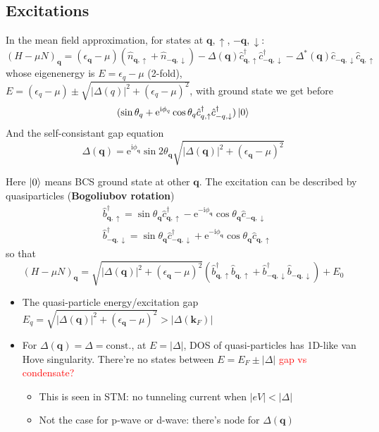 \documentclass[11pt,letterpaper]{article}
\numberwithin{equation}{section} %
\renewcommand*{\vec}[1]{\bm{#1}}
\newcommand\mi{\mathrm{i}}
\newcommand\e{\mathrm{e}}
\newcommand{\spind}{\ensuremath{\downarrow}}
\newcommand{\spinu}{\ensuremath{\uparrow}}
\begin{document}
\subsection{Excitations}
\label{sub:excitations}
In the mean field approximation, for states at $\vec q, \spinu$, $-\vec q,
\spind$: 
\begin{equation}
	(H-\mu N)_{\vec q} = (\epsilon_{\vec q} - \mu)(\hat n_{\vec q,\spinu} + 
	\hat n_{-\vec q, \spind}) - \Delta(\vec q)\hat c_{\vec q,\spinu}^\dagger
	\hat c_{-\vec q,\spind}^\dagger - \Delta^*(\vec q) \hat c_{-\vec q,\spind}
	\hat c_{\vec q, \spinu}
\end{equation}
whose eigenenergy is $E = \epsilon_q - \mu$ (2-fold), $E = (\epsilon_q-\mu)
\pm \sqrt{|\Delta(q)|^2+(\epsilon_q-\mu)^2}$, with ground state we get before
\begin{equation}
	(\sin\theta_q + \e^{\mi\phi_q}\cos\theta_q \hat c_{q,\spinu}^\dagger
	\hat c_{-q,\spind}^\dagger)\ket{0}
\end{equation}
And the self-consistant gap equation
\begin{equation}\label{eq:pari_gap_in_exci}
	\Delta(\vec q) = \e^{\mi\phi_{\vec q}}\sin 2\theta_{\vec q}\sqrt{
	|\Delta(\vec q)|^2+(\epsilon_{\vec q}-\mu)^2}
\end{equation}

Here $\ket 0$ means BCS ground state at other $\vec q$. The excitation can be
described by quasiparticles (\textbf{Bogoliubov rotation})
\begin{align}
	& \hat b_{\vec q, \spinu}^\dagger = \sin\theta_{\vec q}\hat c_{\vec q, \spinu}^\dagger
	-\e^{-\mi\phi_{\vec q}}\cos\theta_{\vec q}\hat c_{-\vec q,\spind} \\
	& \hat b_{-\vec q, \spind}^\dagger = \sin\theta_{\vec q}\hat c_{-\vec q,
	\spind}^\dagger	+\e^{-\mi\phi_{\vec q}}\cos\theta_{\vec q}\hat c_{\vec q,\spinu} 
\end{align}
so that 
\begin{equation}
	(H-\mu N)_{\vec q} = \sqrt{|\Delta(\vec q)|^2 + (\epsilon_{\vec q}
	-\mu)^2} \left( \hat b_{\vec q,\spinu}^\dagger\hat b_{\vec q,\spinu} + 
	\hat b_{-\vec q,\spind}^\dagger \hat b_{-\vec q,\spind}\right) + E_0
\end{equation}
\begin{itemize}
	\item The quasi-particle energy/excitation gap $E_{q} = \sqrt{|\Delta(\vec
		q)|^2 + (\epsilon_{\vec q} -\mu)^2} >|\Delta(\vec k_F)|$
	\item For $\Delta(\vec q) = \Delta = \mbox{const.}$, at $E=|\Delta|$, DOS
		of quasi-particles has 1D-like van Hove singularity. There're no states
		between $E = E_F \pm |\Delta|$ \textcolor{red}{gap vs condensate?}
		\begin{itemize}
		  \item This is seen in STM: no tunneling current when
			  $|eV|<|\Delta|$
		  \item Not the case for p-wave or d-wave: there's node for
			  $\Delta(\vec q)$
		\end{itemize}
\end{itemize}
\end{document}
